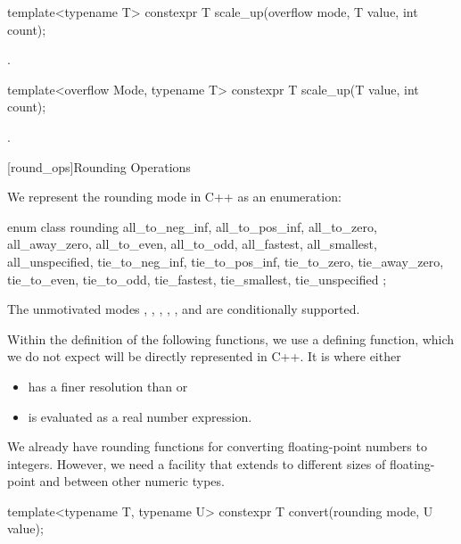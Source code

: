 \begin{addedblock}
\begin{itemdecl}
template<typename T>
constexpr T scale_up(overflow mode, T value, int count);
\end{itemdecl}

\begin{itemdescr}
\returns {}.
\end{itemdescr}

\begin{itemdecl}
template<overflow Mode, typename T>
constexpr T scale_up(T value, int count);
\end{itemdecl}

\begin{itemdescr}
\returns {}.
\end{itemdescr}

[round_ops]{Rounding Operations}

We represent the rounding mode in C++ as an enumeration:

\begin{codeblock}
enum class rounding {
  all_to_neg_inf, all_to_pos_inf,
  all_to_zero, all_away_zero,
  all_to_even, all_to_odd,
  all_fastest, all_smallest,
  all_unspecified,
  tie_to_neg_inf, tie_to_pos_inf,
  tie_to_zero, tie_away_zero,
  tie_to_even, tie_to_odd,
  tie_fastest, tie_smallest,
  tie_unspecified
};
\end{codeblock}

The unmotivated modes , , , , , and  are conditionally supported.

Within the definition of the following functions, we use a defining function, which we do not expect will be directly represented in C++. It is  where  either

\begin{itemize}
\item has a finer resolution than  or
\item is evaluated as a real number expression.
\end{itemize}

We already have rounding functions for converting floating-point numbers to integers. However, we need a facility that extends to different sizes of floating-point and between other numeric types.

\begin{itemdecl}
template<typename T, typename U>
constexpr T convert(rounding mode, U value);
\end{itemdecl}


\end{addedblock}
